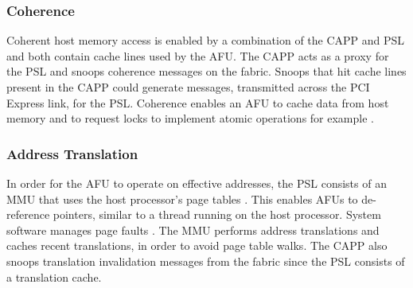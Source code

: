 \subsubsection{Coherence}
Coherent host memory access is enabled by a combination of the CAPP and PSL and both contain cache lines used by the AFU. The CAPP acts as a proxy for the PSL and snoops coherence messages on the fabric. Snoops that hit cache lines present in the CAPP could generate messages, transmitted across the PCI Express link, for the PSL. Coherence enables an AFU to cache data from host memory and to request locks to implement atomic operations for example \cite{capi-manual}.



\subsubsection{Address Translation}
In order for the AFU to operate on effective addresses, the PSL consists of an MMU that uses the host processor's page tables \cite{capi-zurich}. This enables AFUs to de-reference pointers, similar to a thread running on the host processor. System software manages page faults \cite{capi-white}. The MMU performs address translations and caches recent translations, in order to avoid page table walks. The CAPP also snoops translation invalidation messages from the fabric since the PSL consists of a translation cache.


